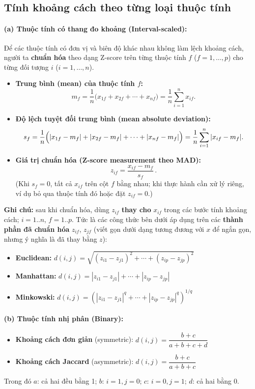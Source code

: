 \documentclass[10pt]{article}
\begin{document}
\subsection{Tính khoảng cách theo từng loại thuộc tính}

\paragraph{(a) Thuộc tính có thang đo khoảng (Interval-scaled):}

Để các thuộc tính có đơn vị và biên độ khác nhau không làm lệch khoảng cách, người ta \textbf{chuẩn hóa} theo dạng Z-score trên từng thuộc tính $f$ ($f = 1,\ldots,p$) cho từng đối tượng $i$ ($i = 1,\ldots,n$).

\begin{itemize}
    \item \textbf{Trung bình (mean) của thuộc tính $f$:}
    \[
    m_f = \frac{1}{n}\bigl(x_{1f} + x_{2f} + \cdots + x_{nf}\bigr) = \frac{1}{n}\sum_{i=1}^{n} x_{if}.
    \]
    \item \textbf{Độ lệch tuyệt đối trung bình (mean absolute deviation):}
    \[
    s_f = \frac{1}{n}\Bigl(|x_{1f} - m_f| + |x_{2f} - m_f| + \cdots + |x_{nf} - m_f|\Bigr)
        = \frac{1}{n}\sum_{i=1}^{n} |x_{if} - m_f|.
    \]
    \item \textbf{Giá trị chuẩn hóa (Z-score measurement theo MAD):}
    \[
    z_{if} = \frac{x_{if} - m_f}{s_f}\,.
    \]
    (Khi $s_f = 0$, tất cả $x_{if}$ trên cột $f$ bằng nhau; khi thực hành cần xử lý riêng, ví dụ bỏ qua thuộc tính đó hoặc đặt $z_{if} = 0$.)
\end{itemize}

\textbf{Ghi chú:} sau khi chuẩn hóa, dùng $z_{if}$ \textbf{thay cho} $x_{if}$ trong các bước tính khoảng cách; $i = 1..n$, $f = 1..p$. Tức là các công thức bên dưới áp dụng trên các \textbf{thành phần đã chuẩn hóa} $z_{if}$, $z_{jf}$ (viết gọn dưới dạng tương đương với $x$ để ngắn gọn, nhưng ý nghĩa là đã thay bằng $z$):
\begin{itemize}
    \item \textbf{Euclidean:} $d(i,j) = \sqrt{(z_{i1}-z_{j1})^2 + \cdots + (z_{ip}-z_{jp})^2}$
    \item \textbf{Manhattan:} $d(i,j) = |z_{i1}-z_{j1}| + \cdots + |z_{ip}-z_{jp}|$
    \item \textbf{Minkowski:} $d(i,j) = \left(|z_{i1}-z_{j1}|^q + \cdots + |z_{ip}-z_{jp}|^q\right)^{1/q}$
\end{itemize}

\paragraph{(b) Thuộc tính nhị phân (Binary):}
\begin{itemize}
    \item \textbf{Khoảng cách đơn giản} (symmetric): $d(i,j) = \dfrac{b+c}{a+b+c+d}$
    \item \textbf{Khoảng cách Jaccard} (asymmetric): $d(i,j) = \dfrac{b+c}{a+b+c}$
\end{itemize}
Trong đó $a$: cả hai đều bằng 1; $b$: $i=1, j=0$; $c$: $i=0, j=1$; $d$: cả hai bằng 0.
\end{document}
